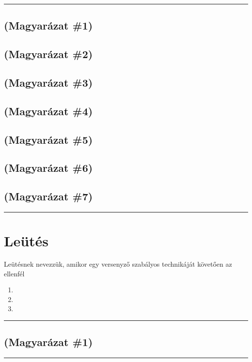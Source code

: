 \documentclass[]{report}
\newenvironment{expl}[0]%
  {\rule{\textwidth}{.2pt}\footnotesize}%
  {\rule{\textwidth}{.2pt}\normalsize}
\begin{document}
\begin{expl}
\section*{(Magyarázat \#1)}

\section*{(Magyarázat \#2)}

\section*{(Magyarázat \#3)}

\section*{(Magyarázat \#4)}

\section*{(Magyarázat \#5)}

\section*{(Magyarázat \#6)}

\section*{(Magyarázat \#7)}

\end{expl}

\chapter{Leütés}

Leütésnek nevezzük, amikor egy versenyző szabályos technikáját követően az ellenfél

\begin{enumerate}
\item

\item

\item

\end{enumerate}

\begin{expl}
\section*{(Magyarázat \#1)}

\end{expl}
\end{document}
